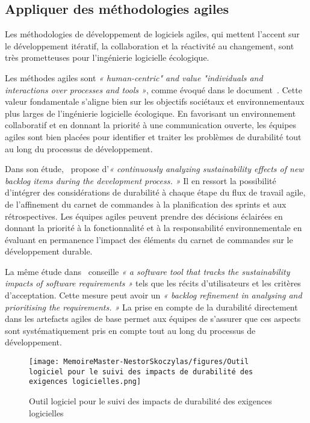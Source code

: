 \subsection{Appliquer des méthodologies agiles}
Les méthodologies de développement de logiciels agiles, qui mettent l'accent sur le développement itératif, la collaboration et la réactivité au changement, sont très prometteuses pour l'ingénierie logicielle écologique.


Les méthodes agiles sont \emph{« human-centric" and value "individuals and interactions over processes and tools »}, comme évoqué dans le document~\cite{SustainableEngNeglectedPerspective}. Cette valeur fondamentale s'aligne bien sur les objectifs sociétaux et environnementaux plus larges de l'ingénierie logicielle écologique. En favorisant un environnement collaboratif et en donnant la priorité à une communication ouverte, les équipes agiles sont bien placées pour identifier et traiter les problèmes de durabilité tout au long du processus de développement.


Dans son étude,~\cite{SustainabilityAwarenessFramework} propose d'\emph{« continuously analyzing sustainability effects of new backlog items during the development process. »} Il en ressort la possibilité d'intégrer des considérations de durabilité à chaque étape du flux de travail agile, de l'affinement du carnet de commandes à la planification des sprints et aux rétrospectives.  Les équipes agiles peuvent prendre des décisions éclairées en donnant la priorité à la fonctionnalité et à la responsabilité environnementale en évaluant en permanence l'impact des éléments du carnet de commandes sur le développement durable.


La même étude dans~\cite{SustainabilityRequirementsEngineering} conseille \emph{« a software tool that tracks the sustainability impacts of software requirements »} tels que les récits d'utilisateurs et les critères d'acceptation. Cette mesure peut avoir un \emph{« backlog refinement in analysing and prioritising the requirements. »} La prise en compte de la durabilité directement dans les artefacts agiles de base permet aux équipes de s'assurer que ces aspects sont systématiquement pris en compte tout au long du processus de développement.

\begin{figure}[H]
    \centering
    \texttt{[image: MemoireMaster-NestorSkoczylas/figures/Outil logiciel pour le suivi des impacts de durabilité des exigences logicielles.png]}
    \caption{Outil logiciel pour le suivi des impacts de durabilité des exigences logicielles}
    \label{fig:outil-logiciel}
\end{figure}

